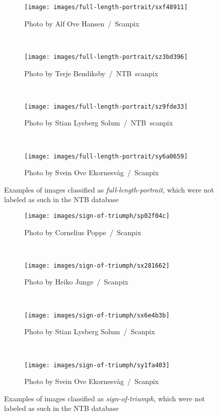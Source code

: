    \begin{figure}[h!]
        \centering
        \begin{subfigure}[a]{0.31\textwidth}
            \texttt{[image: images/full-length-portrait/sxf48911]}
            \caption{Photo by Alf Ove Hansen~/~Scanpix}
        \end{subfigure}
        ~
        \begin{subfigure}[a]{0.31\textwidth}
            \texttt{[image: images/full-length-portrait/sz3bd396]}
            \caption{Photo by Terje Bendiksby~/~NTB~scanpix}
        \end{subfigure}
        \\
        \begin{subfigure}[a]{0.31\textwidth}
            \texttt{[image: images/full-length-portrait/sz9fde33]}
            \caption{Photo by Stian Lysberg Solum~/~NTB~scanpix}
        \end{subfigure}
        ~
        \begin{subfigure}[a]{0.31\textwidth}
            \texttt{[image: images/full-length-portrait/sy6a0659]}
            \caption{Photo by Svein Ove Ekornesvåg~/~Scanpix}
        \end{subfigure}
        \caption{Examples of images classified as \textit{full-length-portrait}, which were not labeled as such in the NTB database}
        \label{fig:main-wrong-flp}
    \end{figure}
    
    \begin{figure}[h!]
        \centering
        \begin{subfigure}[a]{0.31\textwidth}
            \texttt{[image: images/sign-of-triumph/sp02f04c]}
            \caption{Photo by Cornelius Poppe~/~Scanpix}
        \end{subfigure}
        ~
        \begin{subfigure}[a]{0.31\textwidth}
            \texttt{[image: images/sign-of-triumph/sx281662]}
            \caption{Photo by Heiko Junge~/~Scanpix}
        \end{subfigure}
        \\
        \begin{subfigure}[a]{0.31\textwidth}
            \texttt{[image: images/sign-of-triumph/sx6e4b3b]}
            \caption{Photo by Stian Lysberg Solum~/~Scanpix}
        \end{subfigure}
        ~
        \begin{subfigure}[a]{0.31\textwidth}
            \texttt{[image: images/sign-of-triumph/sy1fa403]}
            \caption{Photo by Svein Ove Ekornesvåg~/~Scanpix}
        \end{subfigure}
        \caption{Examples of images classified as \textit{sign-of-triumph}, which were not labeled as such in the NTB database}
        \label{fig:main-wrong-sot}
    \end{figure}
